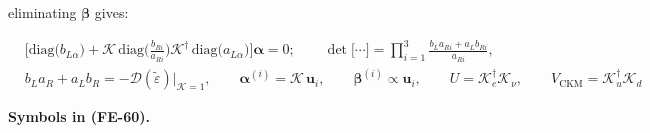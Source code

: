 \documentclass[
  10pt,
]{article}
\begin{document}
eliminating \(\boldsymbol{\beta}\) gives:

\[
\begin{aligned}
&\Big[\mathrm{diag}\big(b_{L\alpha}\big) +
 \mathcal{K}\,\mathrm{diag}\Big(\frac{b_{Ri}}{a_{Ri}}\Big)\mathcal{K}^\dagger\,
 \mathrm{diag}\big(a_{L\alpha}\big)\Big]\boldsymbol{\alpha} = 0;\qquad
 \det\big[\cdots\big] = \prod_{i=1}^{3}\frac{b_La_{Ri} + a_Lb_{Ri}}{a_{Ri}},\\
&b_La_R + a_Lb_R = -\mathcal{D}(\tilde\varepsilon)\big\vert_{\mathcal{K} = 1},\qquad
 \boldsymbol{\alpha}^{(i)} = \mathcal{K}\,\mathbf{u}_i,\qquad \boldsymbol{\beta}^{(i)} \propto
 \mathbf{u}_i,\qquad
 U = \mathcal{K}_e^\dagger\mathcal{K}_\nu,\qquad V_{\mathrm{CKM}} = \mathcal{K}_u^\dagger\mathcal{K}_d
\end{aligned} \tag{FE-60}
\]

\textbf{Symbols in (FE-60).}
\end{document}
